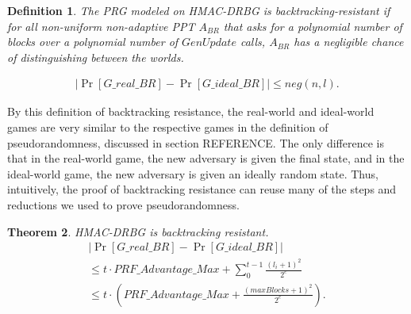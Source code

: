 \documentclass[12pt,lot, lof]{puthesis}
\newenvironment{game}
{ \begin{itemize}[noitemsep,nolistsep] 
}
{ \end{itemize}                  }
\newcommand{\s} {\textrm{ }}
\newcommand{\f}{\frac}
\newcommand{\lar}{\leftarrow}
\newtheorem{thm}{Theorem}
\newtheorem{dfn}[thm]{Definition}
\begin{document}
{\begin{dfn}
The PRG modeled on HMAC-DRBG is backtracking-resistant if for all non-uniform non-adaptive PPT $A_{BR}$ that asks for a polynomial number of blocks over a polynomial number of $GenUpdate$ calls, $A_{BR}$ has a negligible chance of distinguishing between the worlds.

\begin{gather*}
|\Pr[G\_real\_BR] - \Pr[G\_ideal\_BR]| \leq neg(n, l).
\end{gather*}
\end{dfn}

By this definition of backtracking resistance, the real-world and ideal-world games are very similar to the respective games in the definition of pseudorandomness, discussed in section REFERENCE. The only difference is that in the real-world game, the new adversary is given the final state, and in the ideal-world game, the new adversary is given an ideally random state. Thus, intuitively, the proof of backtracking resistance can reuse many of the steps and reductions we used to prove pseudorandomness.



\begin{thm}\label{thm:br} HMAC-DRBG is backtracking resistant. 
  \begin{gather*}
|\Pr[G\_real\_BR] - \Pr[G\_ideal\_BR]| \\
\leq t \cdot PRF\_Advantage\_Max + \sum_{0}^{t-1} \f{(l_i+1)^2}{2^c} \\ 
\leq t \cdot (PRF\_Advantage\_Max + \f{(maxBlocks + 1)^2}{2^c}).
\end{gather*}


\end{thm}}
\end{document}
